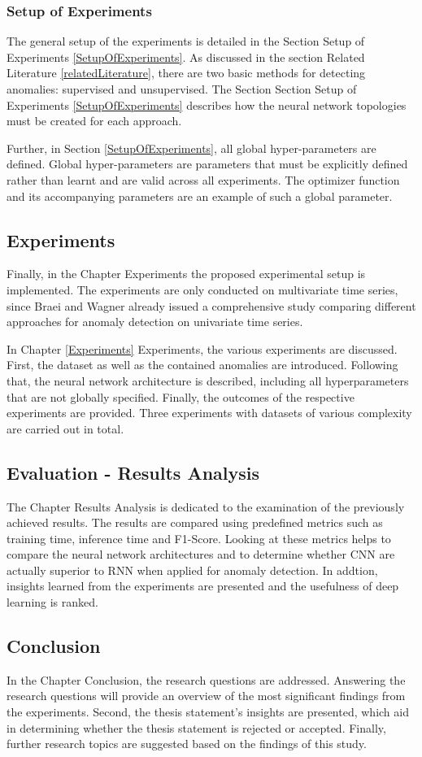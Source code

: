 \subsubsection{Setup of Experiments}
The general setup of the experiments is detailed in the Section Setup of Experiments \ref{SetupOfExperiments}. As discussed in the section Related Literature \ref{relatedLiterature}, there are two basic methods for detecting anomalies: supervised and unsupervised. The Section Section Setup of Experiments \ref{SetupOfExperiments} describes how the neural network topologies must be created for each approach. 
   
Further, in Section \ref{SetupOfExperiments}, all global hyper-parameters are defined. Global hyper-parameters are parameters that must be explicitly defined rather than learnt and are valid across all experiments. The optimizer function and its accompanying parameters are an example of such a global parameter. 

\subsection{Experiments}
Finally, in the Chapter Experiments the proposed experimental setup is implemented. The experiments are only conducted on multivariate time series, since Braei and Wagner \parencite*{Braei2020} already issued a comprehensive study comparing different approaches for anomaly detection on univariate time series. 

In Chapter \ref{Experiments} Experiments, the various experiments are discussed. First, the dataset as well as the contained anomalies are introduced. Following that, the neural network architecture is described, including all hyperparameters that are not globally specified. Finally, the outcomes of the respective experiments are provided. Three experiments with datasets of various complexity are carried out in total.  


\subsection{Evaluation - Results Analysis}
The Chapter Results Analysis is dedicated to the examination of the previously achieved results. The results are compared using predefined metrics such as training time, inference time and F1-Score. Looking at these metrics helps to compare the neural network architectures and to determine whether CNN are actually superior to RNN when applied for anomaly detection. In addtion, insights learned from the experiments are presented and the usefulness of deep learning is ranked.

\subsection{Conclusion}
In the Chapter Conclusion, the research questions are addressed. Answering the research questions will provide an overview of the most significant findings from the experiments. Second, the thesis statement's insights are presented, which aid in determining whether the thesis statement is rejected or accepted. Finally, further research topics are suggested based on the findings of this study. 


